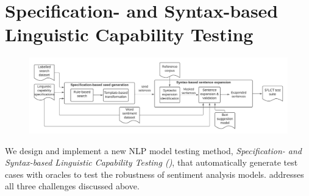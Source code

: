 \section{Specification- and Syntax-based Linguistic Capability Testing}
\label{sec:approach}

\begin{figure}[t]
  \centering
  \includegraphics[width=\linewidth]{figs/overview.pdf}
  \caption{\OverviewFigCaption}
\end{figure}

  
  We design and implement a new NLP model testing method,
  \emph{Specification- and Syntax-based Linguistic Capability Testing
    (\tool{})}, that automatically generate test cases with oracles to
  test the robustness of sentiment analysis models. \tool{} addresses
  all three challenges discussed above.




